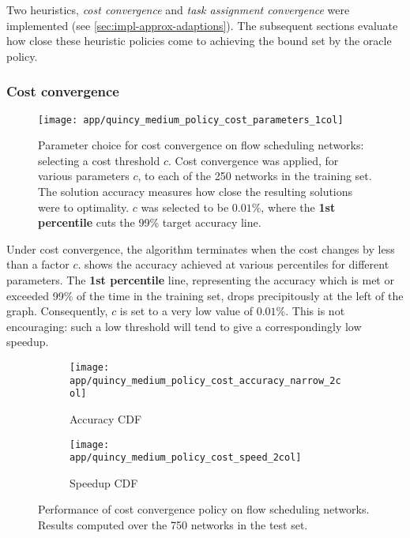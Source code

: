 Two heuristics, \emph{cost convergence} and \emph{task assignment convergence} were implemented (see \cref{sec:impl-approx-adaptions}). The subsequent sections evaluate how close these heuristic policies come to achieving the bound set by the oracle policy.

\subsubsection{Cost convergence}

\begin{figure}
    \centering
    \texttt{[image: app/quincy\_medium\_policy\_cost\_parameters\_1col]}
    \caption[Parameter choice for cost convergence with flow scheduling]{Parameter choice for cost convergence on flow scheduling networks: selecting a cost threshold $c$. Cost convergence was applied, for various parameters $c$, to each of the 250 networks in the training set. The solution accuracy measures how close the resulting solutions were to optimality. $c$ was selected to be $0.01\%$, where the \textbf{\color{matplotlib_blue} 1st percentile} cuts the 99\% target accuracy line.}
    \label{fig:app-quincy-medium-cost-parameters}
\end{figure}

Under cost convergence, the algorithm terminates when the cost changes by less than a factor $c$.  shows the accuracy achieved at various percentiles for different parameters. The \textbf{\color{matplotlib_blue} 1st percentile} line, representing the accuracy which is met or exceeded 99\% of the time in the training set, drops precipitously at the left of the graph. Consequently, $c$ is set to a very low value of $0.01\%$. This is not encouraging: such a low threshold will tend to give a correspondingly low speedup.

\begin{figure}
    \begin{widepage}
        \begin{subfigure}[c]{0.5\textwidth}
            \texttt{[image: app/quincy\_medium\_policy\_cost\_accuracy\_narrow\_2col]}
            \caption{Accuracy CDF}
            \label{fig:app-quincy-medium-cost-cdf:accuracy}
        \end{subfigure}
        \begin{subfigure}[c]{0.5\textwidth}
            \texttt{[image: app/quincy\_medium\_policy\_cost\_speed\_2col]}
            \caption{Speedup CDF}
            \label{fig:app-quincy-medium-cost-cdf:speedup}
        \end{subfigure}
    \end{widepage}
    \caption[Performance of cost convergence on flow scheduling networks]{Performance of cost convergence policy on flow scheduling networks. Results computed over the 750 networks in the test set.}
    \label{fig:app-quincy-medium-cost-cdf}
\end{figure}

